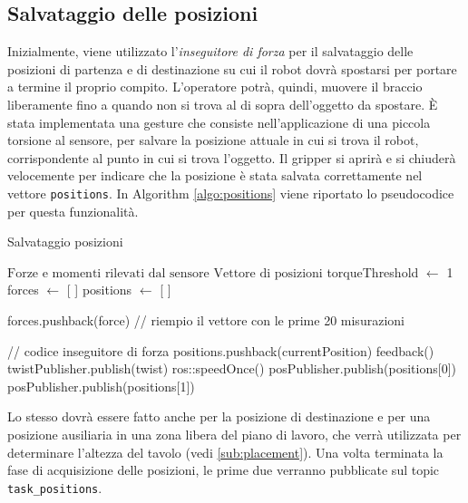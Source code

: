 \subsection{Salvataggio delle posizioni} \label{sub:positions}
Inizialmente, viene utilizzato l'\textit{inseguitore di forza} per il salvataggio delle posizioni di partenza e di destinazione 
su cui il robot dovr\`{a} spostarsi per portare a termine il proprio compito. 
L'operatore potr\`{a}, quindi, muovere il braccio liberamente fino a quando non si trova al di sopra dell'oggetto da spostare. 
\`{E} stata implementata una gesture che consiste nell'applicazione di una piccola torsione al sensore, 
per salvare la posizione attuale in cui si trova il robot, corrispondente al punto in cui si trova l'oggetto. Il gripper 
si aprir\`{a} e si chiuder\`{a} velocemente per indicare che la posizione \`{e} stata salvata correttamente nel vettore 
\verb|positions|. In Algorithm \ref{algo:positions} viene riportato lo pseudocodice per questa funzionalit\`{a}.
\newpage
\begin{algorithm}[H]
    \caption{Salvataggio posizioni}\label{algo:positions}
    \begin{algorithmic}[1]
        \Require $\text{Forze e momenti rilevati dal sensore}$
        \Ensure $\text{Vettore di posizioni}$
        \State torqueThreshold $\gets$ 1
        \State forces $\gets$ [ ]
        \State positions $\gets$ [ ]
        
                \State forces.pushback(force) // riempio il vettore con le prime 20 misurazioni
            \Else

                // codice inseguitore di forza
                    \State positions.pushback(currentPosition)
                    \State feedback()
                \EndIf
                \State twistPublisher.publish(twist)
            \EndIf
            \State ros::speedOnce()
        \EndWhile
        \State posPublisher.publish(positions[0])
        \State posPublisher.publish(positions[1])
    \end{algorithmic}
    \end{algorithm}
Lo stesso dovr\`{a} essere fatto anche per la posizione di destinazione e per una posizione ausiliaria in una zona libera 
del piano di lavoro, che verr\`{a} utilizzata per determinare l'altezza del tavolo (vedi \ref{sub:placement}). 
Una volta terminata la fase di acquisizione delle posizioni, 
le prime due verranno pubblicate sul topic \verb|task_positions|.

